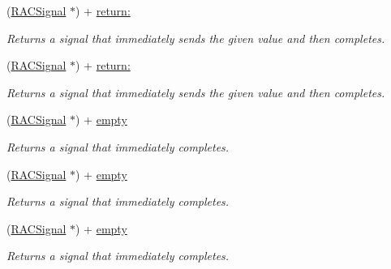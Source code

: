 \begin{DoxyCompactItemize}
\mbox{\label{interface_r_a_c_signal_a41b2f3cea45bb3a14911299cb572b7d9}} 
(\mbox{\hyperlink{interface_r_a_c_signal}{R\+A\+C\+Signal}} $\ast$) + \mbox{\hyperlink{interface_r_a_c_signal_a41b2f3cea45bb3a14911299cb572b7d9}{return\+:}}
\begin{DoxyCompactList}\small\item\em Returns a signal that immediately sends the given value and then completes. \end{DoxyCompactList}\item 
\mbox{\label{interface_r_a_c_signal_a41b2f3cea45bb3a14911299cb572b7d9}} 
(\mbox{\hyperlink{interface_r_a_c_signal}{R\+A\+C\+Signal}} $\ast$) + \mbox{\hyperlink{interface_r_a_c_signal_a41b2f3cea45bb3a14911299cb572b7d9}{return\+:}}
\begin{DoxyCompactList}\small\item\em Returns a signal that immediately sends the given value and then completes. \end{DoxyCompactList}\item 
\mbox{\label{interface_r_a_c_signal_a7905f73a3de844e28a19d9d63cd37214}} 
(\mbox{\hyperlink{interface_r_a_c_signal}{R\+A\+C\+Signal}} $\ast$) + \mbox{\hyperlink{interface_r_a_c_signal_a7905f73a3de844e28a19d9d63cd37214}{empty}}
\begin{DoxyCompactList}\small\item\em Returns a signal that immediately completes. \end{DoxyCompactList}\item 
\mbox{\label{interface_r_a_c_signal_a7905f73a3de844e28a19d9d63cd37214}} 
(\mbox{\hyperlink{interface_r_a_c_signal}{R\+A\+C\+Signal}} $\ast$) + \mbox{\hyperlink{interface_r_a_c_signal_a7905f73a3de844e28a19d9d63cd37214}{empty}}
\begin{DoxyCompactList}\small\item\em Returns a signal that immediately completes. \end{DoxyCompactList}\item 
\mbox{\label{interface_r_a_c_signal_a7905f73a3de844e28a19d9d63cd37214}} 
(\mbox{\hyperlink{interface_r_a_c_signal}{R\+A\+C\+Signal}} $\ast$) + \mbox{\hyperlink{interface_r_a_c_signal_a7905f73a3de844e28a19d9d63cd37214}{empty}}
\begin{DoxyCompactList}\small\item\em Returns a signal that immediately completes. \end{DoxyCompactList}\end{DoxyCompactItemize}
